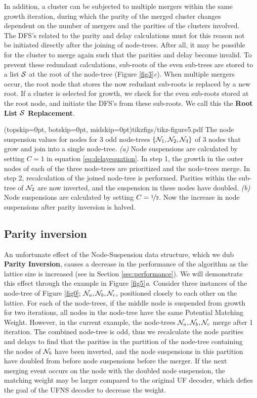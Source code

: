 In addition, a cluster can be subjected to multiple mergers within the same growth iteration, during which the parity of the merged cluster changes dependent on the number of mergers and the parities of the clusters involved. The DFS's related to the parity and delay calculations must for this reason not be initiated directly after the joining of node-trees. After all, it may be possible for the cluster to merge again such that the parities and delay become invalid. To prevent these redundant calculations, sub-roots of the even sub-trees are stored to a list $\mathcal{S}$ at the root of the node-tree (Figure \ref{fig3}\emph{c}). When multiple mergers occur, the root node that stores the now redudant sub-roots is replaced by a new root. If a cluster is selected for growth, we check for the even sub-roots stored at the root node, and initiate the DFS's from these sub-roots. We call this the \textbf{Root List $\mathcal{S}$ Replacement}. 

\Figure[htb](topskip=0pt, botskip=0pt, midskip=0pt){tikzfigs/tikz-figure5.pdf}{
    The node suspension values for nodes for 3 odd node-trees $\{\mathcal{N}_1, \mathcal{N}_2, \mathcal{N}_3\}$ of 3 nodes that grow and join into a single node-tree. \emph{(a)} Node suspensions are calculated by setting $C=1$ in equation \eqref{eq:delayequation}. In step 1, the growth in the outer nodes of each of the three node-trees are prioritized and the node-trees merge. In step 2, recalculation of the joined node-tree is performed. Parities within the sub-tree of $\mathcal{N}_2$ are now inverted, and the suspension in these nodes have doubled. \emph{(b)} Node suspensions are calculated by setting $C=\nicefrac{1}{2}$. Now the increase in node suspensions after parity inversion is halved.\label{fig5}}

\subsection{Parity inversion}\label{sec:inversion}
An unfortunate effect of the Node-Suspension data structure, which we dub \textbf{Parity Inversion}, causes a decrease in the performance of the algorithm as the lattice size is increased (see in Section \ref{sec:performance}). We will demonstrate this effect through the example in Figure \ref{fig5}\emph{a}. Consider three instances of the node-tree of Figure \ref{fig0}; $\mathcal{N}_a, \mathcal{N}_b, \mathcal{N}_c$, positioned closely to each other on the lattice. For each of the node-trees, if the middle node is suspended from growth for two iterations, all nodes in the node-tree have the same Potential Matching Weight. However, in the current example, the node-trees $\mathcal{N}_a, \mathcal{N}_b, \mathcal{N}_c$ merge after 1 iteration. The combined node-tree is odd, thus we recalculate the node parities and delays to find that the parities in the partition of the node-tree containing the nodes of $\mathcal{N}_b$ have been inverted, and the node suspensions in this partition have doubled from before node suspensions before the merger. If the next merging event occurs on the node with the doubled node suspension, the matching weight may be larger compared to the original UF decoder, which defies the goal of the UFNS decoder to decrease the weight.

